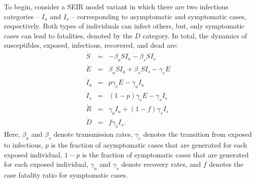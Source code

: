 To begin, consider a SEIR model variant in which there are two infectious categories --
$I_a$ and $I_s$ -- corresponding to asymptomatic and symptomatic cases,
respectively. Both types of individuals can infect others, but,
only symptomatic cases can lead to fatalities, denoted
by the $D$ category. In total, the dynamics of susceptibles, exposed,
infectious, recovered, and dead are:
\begin{eqnarray}
\dot{S}&=&-\beta_a S I_a -\beta_s S I_s \\
\dot{E}&=&\beta_a S I_a +\beta_s S I_s -\gamma_e E\\
\dot{I}_a&=&p\gamma_e E-\gamma_a I_a\\
\dot{I}_s&=&(1-p)\gamma_e E-\gamma_s I_s\\
\dot{R}&=&\gamma_a I_a + (1-f)\gamma_s I_s \\
\dot{D}&=&f\gamma_s I_s.
\end{eqnarray}
Here, $\beta_a$ and $\beta_s$ denote transmission rates,
$\gamma_e$ denotes the transition from exposed to infectious,
$p$ is the fraction of asymptomatic cases that
are generated for each exposed individual,
$1-p$ is the fraction of symptomatic cases that
are generated for each exposed individual,
$\gamma_a$ and $\gamma_s$ denote recovery rates,
and $f$ denotes the case fatality ratio for symptomatic cases.


